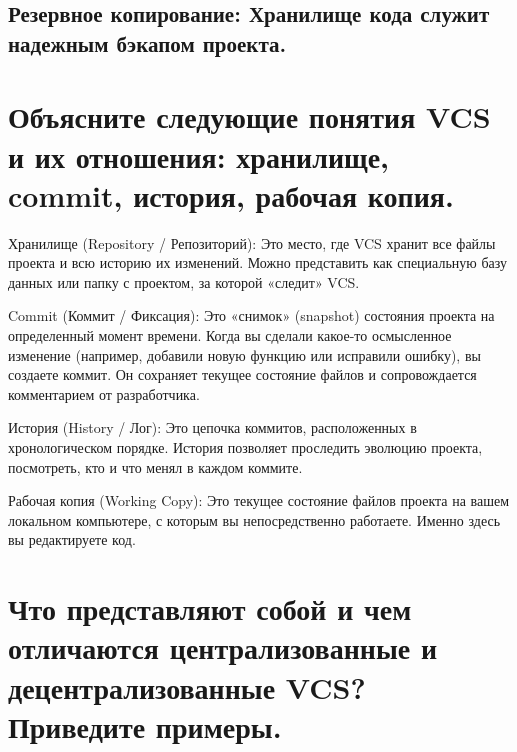 \documentclass[
  english,
  russian,
  12pt,
  a4paper,
  DIV=11,
  numbers=noendperiod]{scrreprt}
\begin{document}
\subsection{Резервное копирование: Хранилище кода служит надежным
бэкапом
проекта.}\label{ux440ux435ux437ux435ux440ux432ux43dux43eux435-ux43aux43eux43fux438ux440ux43eux432ux430ux43dux438ux435-ux445ux440ux430ux43dux438ux43bux438ux449ux435-ux43aux43eux434ux430-ux441ux43bux443ux436ux438ux442-ux43dux430ux434ux435ux436ux43dux44bux43c-ux431ux44dux43aux430ux43fux43eux43c-ux43fux440ux43eux435ux43aux442ux430.}

\section{Объясните следующие понятия VCS и их отношения: хранилище,
commit, история, рабочая
копия.}\label{ux43eux431ux44aux44fux441ux43dux438ux442ux435-ux441ux43bux435ux434ux443ux44eux449ux438ux435-ux43fux43eux43dux44fux442ux438ux44f-vcs-ux438-ux438ux445-ux43eux442ux43dux43eux448ux435ux43dux438ux44f-ux445ux440ux430ux43dux438ux43bux438ux449ux435-commit-ux438ux441ux442ux43eux440ux438ux44f-ux440ux430ux431ux43eux447ux430ux44f-ux43aux43eux43fux438ux44f.}

Хранилище (Repository / Репозиторий): Это место, где VCS хранит все
файлы проекта и всю историю их изменений. Можно представить как
специальную базу данных или папку с проектом, за которой «следит» VCS.

Commit (Коммит / Фиксация): Это «снимок» (snapshot) состояния проекта на
определенный момент времени. Когда вы сделали какое-то осмысленное
изменение (например, добавили новую функцию или исправили ошибку), вы
создаете коммит. Он сохраняет текущее состояние файлов и сопровождается
комментарием от разработчика.

История (History / Лог): Это цепочка коммитов, расположенных в
хронологическом порядке. История позволяет проследить эволюцию проекта,
посмотреть, кто и что менял в каждом коммите.

Рабочая копия (Working Copy): Это текущее состояние файлов проекта на
вашем локальном компьютере, с которым вы непосредственно работаете.
Именно здесь вы редактируете код.

\section{Что представляют собой и чем отличаются централизованные и
децентрализованные VCS? Приведите
примеры.}\label{ux447ux442ux43e-ux43fux440ux435ux434ux441ux442ux430ux432ux43bux44fux44eux442-ux441ux43eux431ux43eux439-ux438-ux447ux435ux43c-ux43eux442ux43bux438ux447ux430ux44eux442ux441ux44f-ux446ux435ux43dux442ux440ux430ux43bux438ux437ux43eux432ux430ux43dux43dux44bux435-ux438-ux434ux435ux446ux435ux43dux442ux440ux430ux43bux438ux437ux43eux432ux430ux43dux43dux44bux435-vcs-ux43fux440ux438ux432ux435ux434ux438ux442ux435-ux43fux440ux438ux43cux435ux440ux44b.}
\end{document}
